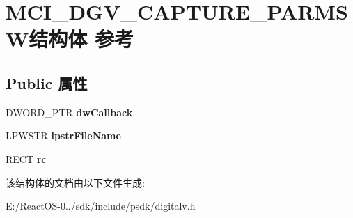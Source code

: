 \hypertarget{struct_m_c_i___d_g_v___c_a_p_t_u_r_e___p_a_r_m_s_w}{}\section{M\+C\+I\+\_\+\+D\+G\+V\+\_\+\+C\+A\+P\+T\+U\+R\+E\+\_\+\+P\+A\+R\+M\+S\+W结构体 参考}
\label{struct_m_c_i___d_g_v___c_a_p_t_u_r_e___p_a_r_m_s_w}
\subsection*{Public 属性}
\begin{DoxyCompactItemize}
\item 
\mbox{\label{struct_m_c_i___d_g_v___c_a_p_t_u_r_e___p_a_r_m_s_w_a83786419c4a9f921ff3e06cc102a7609}} 
D\+W\+O\+R\+D\+\_\+\+P\+TR {\bfseries dw\+Callback}
\item 
\mbox{\label{struct_m_c_i___d_g_v___c_a_p_t_u_r_e___p_a_r_m_s_w_a7596bfba00063caccc0800c1e3d8c4b3}} 
L\+P\+W\+S\+TR {\bfseries lpstr\+File\+Name}
\item 
\mbox{\label{struct_m_c_i___d_g_v___c_a_p_t_u_r_e___p_a_r_m_s_w_ad0e2330b5a2d71991d1ca9efc556ce88}} 
\hyperlink{structtag_r_e_c_t}{R\+E\+CT} {\bfseries rc}
\end{DoxyCompactItemize}


该结构体的文档由以下文件生成\+:\begin{DoxyCompactItemize}
\item 
E\+:/\+React\+O\+S-\/0../sdk/include/psdk/digitalv.\+h\end{DoxyCompactItemize}
